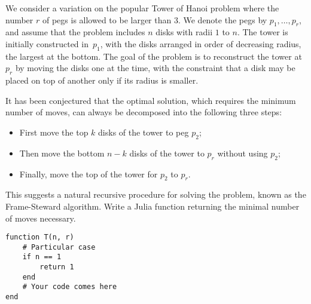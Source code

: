 \begin{task}
    We consider a variation on the popular Tower of Hanoi problem
    where the number $r$ of pegs is allowed to be larger than 3.
    We denote the pegs by $p_1, \dots, p_r$,
    and assume that the problem includes $n$ disks with radii $1$ to $n$.
    The tower is initially constructed in~$p_1$,
    with the disks arranged in order of decreasing radius, the largest at the bottom.
    The goal of the problem is to reconstruct the tower at $p_r$ by moving the disks one at the time,
    with the constraint that a disk may be placed on top of another only if its radius is smaller.

    It has been conjectured that the optimal solution,
    which requires the minimum number of moves,
    can always be decomposed into the following three steps:
    \begin{itemize}
        \item First move the top $k$ disks of the tower to peg $p_2$;
        \item Then move the bottom $n-k$ disks of the tower to $p_r$ without using $p_2$;
        \item Finally, move the top of the tower for $p_2$ to $p_r$.
    \end{itemize}
    This suggests a natural recursive procedure for solving the problem, known as the Frame-Steward algorithm.
    Write a Julia function  returning the minimal number of moves necessary.
\begin{verbatim}
function T(n, r)
    # Particular case
    if n == 1
        return 1
    end
    # Your code comes here
end
\end{verbatim}

\end{task}

